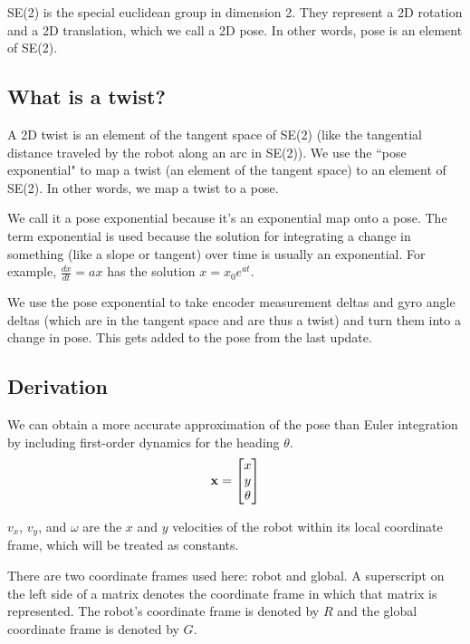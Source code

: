 SE(2) is the special euclidean group in dimension 2. They represent a 2D
rotation and a 2D translation, which we call a 2D pose. In other words, pose is
an element of SE(2).

\subsection{What is a twist?}

A 2D twist is an element of the tangent space of SE(2) (like the tangential
distance traveled by the robot along an arc in SE(2)). We use the ``pose
exponential" to map a twist (an element of the tangent space) to an element of
SE(2). In other words, we map a twist to a pose.

We call it a pose exponential because it's an exponential map onto a pose. The
term exponential is used because the solution for integrating a change in
something (like a slope or tangent) over time is usually an exponential. For
example, $\frac{dx}{dt} = ax$ has the solution $x = x_0 e^{at}$.

We use the pose exponential to take encoder measurement deltas and gyro angle
deltas (which are in the tangent space and are thus a twist) and turn them into
a change in pose. This gets added to the pose from the last update.

\subsection{Derivation}

We can obtain a more accurate approximation of the pose than Euler integration
by including first-order dynamics for the heading $\theta$.
\begin{equation*}
  \mathbf{x} = \begin{bmatrix}
    x \\
    y \\
    \theta
  \end{bmatrix}
\end{equation*}

$v_x$, $v_y$, and $\omega$ are the $x$ and $y$ velocities of the robot within
its local coordinate frame, which will be treated as constants.
\begin{remark}
  There are two coordinate frames used here: robot and global. A superscript on
  the left side of a matrix denotes the coordinate frame in which that matrix is
  represented. The robot's coordinate frame is denoted by $R$ and the global
  coordinate frame is denoted by $G$.
\end{remark}

